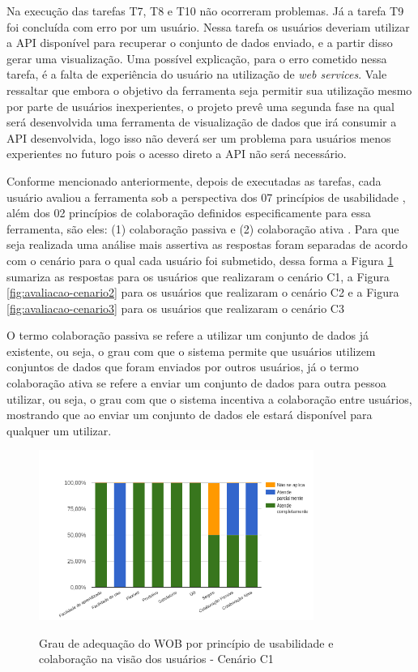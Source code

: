 Na execução das tarefas T7, T8 e T10 não ocorreram problemas. Já a tarefa T9 foi concluída 
com erro por um usuário. Nessa tarefa os usuários deveriam utilizar a API disponível para 
recuperar o conjunto de dados enviado, e a partir disso gerar uma visualização. Uma possível 
explicação, para o erro cometido nessa tarefa, é a falta de experiência do usuário na 
utilização de \textit{web services}. Vale ressaltar que embora o objetivo da ferramenta 
seja permitir sua utilização mesmo por parte de usuários inexperientes, o projeto prevê uma 
segunda fase na qual será desenvolvida uma ferramenta de visualização de dados que irá 
consumir a API desenvolvida, logo isso não deverá ser um problema para usuários menos 
experientes no futuro pois o acesso direto a API não será necessário.

Conforme mencionado anteriormente, depois de executadas as tarefas, cada usuário avaliou a 
ferramenta sob a perspectiva dos 07 princípios de usabilidade \cite{nielsen1994usability}, 
além dos 02 princípios de colaboração definidos especificamente para essa ferramenta, são 
eles: (1) colaboração passiva e (2) colaboração ativa . Para que seja realizada uma análise 
mais assertiva as respostas foram separadas de acordo com o cenário para o qual cada usuário 
foi submetido, dessa forma a Figura \ref{fig:avaliacao-cenario1} sumariza as respostas para os 
usuários que realizaram o cenário C1, a Figura \ref{fig:avaliacao-cenario2} para os usuários 
que realizaram o cenário C2 e a Figura \ref{fig:avaliacao-cenario3} para os usuários que 
realizaram o cenário C3

O termo colaboração passiva se refere a utilizar um conjunto de dados já existente, ou 
seja, o grau com que o sistema permite que usuários utilizem conjuntos de dados que foram 
enviados por outros usuários, já o termo colaboração ativa se refere a enviar um conjunto 
de dados para outra pessoa utilizar, ou seja, o grau com que o sistema incentiva a 
colaboração entre usuários, mostrando que ao enviar um conjunto de dados ele estará 
disponível para qualquer um utilizar. \newline \newline



\begin{figure}[!htb]
    \centering
    \caption{Grau de adequação do WOB por princípio de usabilidade e colaboração na visão dos usuários - Cenário C1}
    \includegraphics[width=0.8\textwidth]{./04-figuras/avaliacao-cenario1}
    \label{fig:avaliacao-cenario1}
\end{figure}

